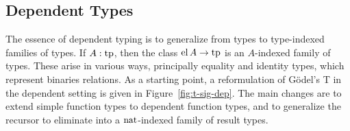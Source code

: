\documentclass[11pt,twoside]{article}
\newcommand{\const}[1]{\text{#1}}
\newcommand{\arrclass}[2]{{#1}\to{#2}}
\newcommand{\appobj}[2]{{#1}\,{#2}}
\begin{document}
\subsection{Dependent Types}

The essence of dependent typing is to generalize from types to type-indexed families of
types.  If $A:\tpsort$, then the class $\arrclass{\elof{A}}{\tpsort}$ is an $A$-indexed
family of types.  These arise in various ways, principally equality and identity types,
which represent binaries relations.  As a starting point, a reformulation of G\"odel's T
in the dependent setting is given in Figure~\ref{fig:t-sig-dep}.  The main changes are to
extend simple function types to dependent function types, and to generalize the recursor
to eliminate into a $\nattp$-indexed family of result types.

\newcommand{\pitp}{\const{pi}}
\newcommand{\piof}[2]{\appobj{\appobj{\pitp}{#1}}{#2}}
\end{document}
